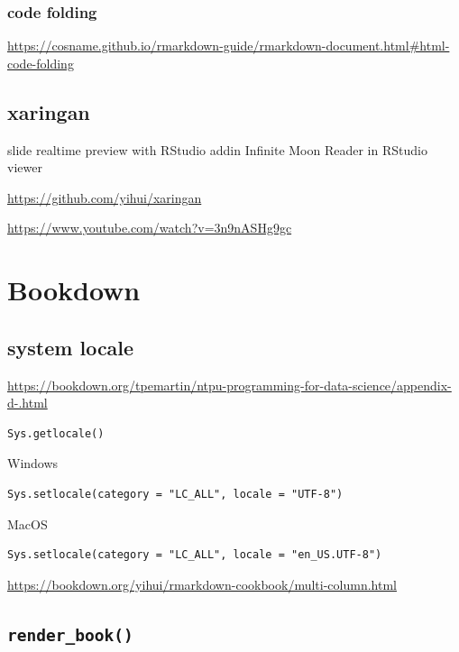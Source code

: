 \documentclass[
]{book}
\theoremstyle{definition}
\theoremstyle{definition}
\theoremstyle{definition}
\theoremstyle{definition}
\theoremstyle{remark}
\begin{document}
\subsubsection{code folding}\label{code-folding}

\url{https://cosname.github.io/rmarkdown-guide/rmarkdown-document.html\#html-code-folding}

\subsection{xaringan}\label{xaringan}

slide realtime preview with RStudio addin Infinite Moon Reader in RStudio viewer

\url{https://github.com/yihui/xaringan}

\url{https://www.youtube.com/watch?v=3n9nASHg9gc}

\section{Bookdown}\label{bookdown}

\subsection{system locale}\label{system-locale}

\url{https://bookdown.org/tpemartin/ntpu-programming-for-data-science/appendix-d-.html}

\begin{verbatim}
Sys.getlocale()
\end{verbatim}

Windows

\begin{verbatim}
Sys.setlocale(category = "LC_ALL", locale = "UTF-8")
\end{verbatim}

MacOS

\begin{verbatim}
Sys.setlocale(category = "LC_ALL", locale = "en_US.UTF-8")
\end{verbatim}

\url{https://bookdown.org/yihui/rmarkdown-cookbook/multi-column.html}

\subsection{\texorpdfstring{\texttt{render\_book()}}{render\_book()}}\label{render_book}
\end{document}
